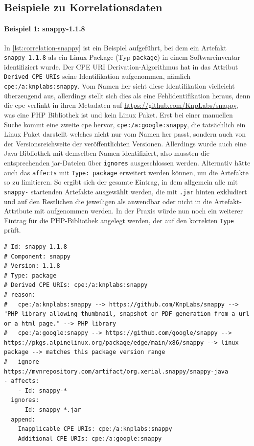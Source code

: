 \subsection{Beispiele zu Korrelationsdaten}

\paragraph{Beispiel 1: snappy-1.1.8}
In \autoref{lst:correlation-snappy} ist ein Beispiel aufgeführt, bei dem ein Artefakt \texttt{snappy-1.1.8} als ein Linux Package (Typ \texttt{package}) in einem Softwareinventar identifiziert wurde.
Der CPE URI Derivation-Algorithmus hat in das Attribut \texttt{Derived CPE URIs} seine Identifikation aufgenommen, nämlich \texttt{cpe:/a:knplabs:snappy}.
Vom Namen her sieht diese Identifikation vielleicht überzeugend aus, allerdings stellt sich dies als eine Fehlidentifikation heraus, denn die \acrshort{cpe} verlinkt in ihren Metadaten auf \url{https://github.com/KnpLabs/snappy}, was eine PHP Bibliothek ist und kein Linux Paket.
Erst bei einer manuellen Suche kommt eine zweite \acrshort{cpe} hervor, \texttt{cpe:/a:google:snappy}, die tatsächlich ein Linux Paket darstellt welches nicht nur vom Namen her passt, sondern auch von der Versionsreichweite der veröffentlichten Versionen.
Allerdings wurde auch eine Java-Bibliothek mit demselben Namen identifiziert, also mussten die entsprechenden jar-Dateien über \texttt{ignores} ausgeschlossen werden.
Alternativ hätte auch das \texttt{affects} mit \texttt{Type: package} erweitert werden können, um die Artefakte so zu limitieren.
So ergibt sich der gesamte Eintrag, in dem allgemein alle mit \texttt{snappy-} startenden Artefakte ausgewählt werden, die mit \texttt{.jar} hinten exkludiert und auf den Restlichen die jeweiligen  als anwendbar oder nicht in die Artefakt-Attribute mit aufgenommen werden.
In der Praxis würde nun noch ein weiterer Eintrag für die PHP-Bibliothek angelegt werden, der auf den korrekten \texttt{Type} prüft.

\begin{lstlisting}[style=yaml,caption={Korrelationseintrag für Snappy-Komponenten},label={lst:correlation-snappy}]
# Id: snappy-1.1.8
# Component: snappy
# Version: 1.1.8
# Type: package
# Derived CPE URIs: cpe:/a:knplabs:snappy
# reason:
#   cpe:/a:knplabs:snappy --> https://github.com/KnpLabs/snappy --> "PHP library allowing thumbnail, snapshot or PDF generation from a url or a html page." --> PHP library
#   cpe:/a:google:snappy --> https://github.com/google/snappy --> https://pkgs.alpinelinux.org/package/edge/main/x86/snappy --> linux package --> matches this package version range
#   ignore https://mvnrepository.com/artifact/org.xerial.snappy/snappy-java
- affects:
    - Id: snappy-*
  ignores:
    - Id: snappy-*.jar
  append:
    Inapplicable CPE URIs: cpe:/a:knplabs:snappy
    Additional CPE URIs: cpe:/a:google:snappy
\end{lstlisting}

